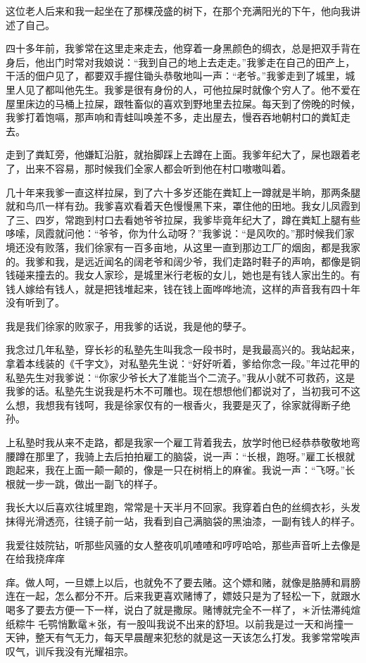 \documentclass[12pt,UTF8]{ctexbook}
\begin{document}
这位老人后来和我一起坐在了那棵茂盛的树下，在那个充满阳光的下午，他向我讲述了自己。

四十多年前，我爹常在这里走来走去，他穿着一身黑颜色的绸衣，总是把双手背在身后，他出门时常对我娘说：“我到自己的地上去走走。”我爹走在自己的田产上，干活的佃户见了，都要双手握住锄头恭敬地叫一声：“老爷。”我爹走到了城里，城里人见了都叫他先生。我爹是很有身份的人，可他拉屎时就像个穷人了。他不爱在屋里床边的马桶上拉屎，跟牲畜似的喜欢到野地里去拉屎。每天到了傍晚的时候，我爹打着饱嗝，那声响和青蛙叫唤差不多，走出屋去，慢吞吞地朝村口的粪缸走去。

走到了粪缸旁，他嫌缸沿脏，就抬脚踩上去蹲在上面。我爹年纪大了，屎也跟着老了，出来不容易，那时候我们全家人都会听到他在村口嗷嗷叫着。

几十年来我爹一直这样拉屎，到了六十多岁还能在粪缸上一蹲就是半晌，那两条腿就和鸟爪一样有劲。我爹喜欢看着天色慢慢黑下来，罩住他的田地。我女儿凤霞到了三、四岁，常跑到村口去看她爷爷拉屎，我爹毕竟年纪大了，蹲在粪缸上腿有些哆嗦，凤霞就问他：“爷爷，你为什么动呀？”我爹说：“是风吹的。”那时候我们家境还没有败落，我们徐家有一百多亩地，从这里一直到那边工厂的烟囱，都是我家的。我爹和我，是远近闻名的阔老爷和阔少爷，我们走路时鞋子的声响，都像是铜钱碰来撞去的。我女人家珍，是城里米行老板的女儿，她也是有钱人家出生的。有钱人嫁给有钱人，就是把钱堆起来，钱在钱上面哗哗地流，这样的声音我有四十年没有听到了。

我是我们徐家的败家子，用我爹的话说，我是他的孽子。

我念过几年私塾，穿长衫的私塾先生叫我念一段书时，是我最高兴的。我站起来，拿着本线装的《千字文》，对私塾先生说：“好好听着，爹给你念一段。”年过花甲的私塾先生对我爹说：“你家少爷长大了准能当个二流子。”我从小就不可救药，这是我爹的话。私塾先生说我是朽木不可雕也。现在想想他们都说对了，当初我可不这么想，我想我有钱呵，我是徐家仅有的一根香火，我要是灭了，徐家就得断子绝孙。

上私塾时我从来不走路，都是我家一个雇工背着我去，放学时他已经恭恭敬敬地弯腰蹲在那里了，我骑上去后拍拍雇工的脑袋，说一声：“长根，跑呀。”雇工长根就跑起来，我在上面一颠一颠的，像是一只在树梢上的麻雀。我说一声：“飞呀。”长根就一步一跳，做出一副飞的样子。

我长大以后喜欢往城里跑，常常是十天半月不回家。我穿着白色的丝绸衣衫，头发抹得光滑透亮，往镜子前一站，我看到自己满脑袋的黑油漆，一副有钱人的样子。

我爱往妓院钻，听那些风骚的女人整夜叽叽喳喳和哼哼哈哈，那些声音听上去像是在给我挠痒痒

痒。做人呵，一旦嫖上以后，也就免不了要去赌。这个嫖和赌，就像是胳膊和肩膀连在一起，怎么都分不开。后来我更喜欢赌博了，嫖妓只是为了轻松一下，就跟水喝多了要去方便一下一样，说白了就是撒尿。赌博就完全不一样了，＊沂怯滞纯煊纸粽牛乇鹗悄歉鼋＊张，有一股叫我说不出来的舒坦。以前我是过一天和尚撞一天钟，整天有气无力，每天早晨醒来犯愁的就是这一天该怎么打发。我爹常常唉声叹气，训斥我没有光耀祖宗。
\end{document}
